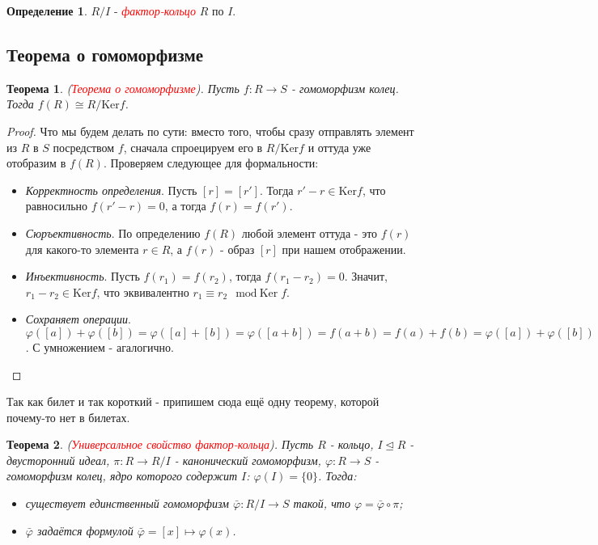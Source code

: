 \documentclass[a4paper,100pt]{article}
\theoremstyle{indented}
\newtheorem{theorem}{Теорема}
\theoremstyle{definition}
\newtheorem{defn}{Определение}
\theoremstyle{remark}
\begin{document}
\begin{defn}
    $R/I$ - \hypertarget{n24}{\textcolor{red}{\textit{фактор-кольцо}}} $R$ по $I$.
\end{defn}

\resetall

\subsection{Теорема о гомоморфизме}

\begin{theorem}
    (\hypertarget{n25}{\textcolor{red}{\textit{Теорема о гомоморфизме}}}). Пусть $f:R\rightarrow S$ - гомоморфизм колец. Тогда $f(R)\cong R/\text{Ker}f$.
\end{theorem}

\begin{proof}
    Что мы будем делать по сути: вместо того, чтобы сразу отправлять элемент из $R$ в $S$ посредством $f$, сначала спроецируем его в $R/\text{Ker} f$ и оттуда уже отобразим в $f(R)$. Проверяем следующее для формальности:\ 

    \begin{itemize}
        \item \textit{Корректность определения}. Пусть $[r]=[r']$. Тогда $r'-r\in \text{Ker} f$, что равносильно $f(r'-r)=0$, а тогда $f(r)=f(r')$.
        \item \textit{Сюръективность}. По определению $f(R)$ любой элемент оттуда - это $f(r)$ для какого-то элемента $r\in R$, а $f(r)$ - образ $[r]$ при нашем отображении.
        \item \textit{Инъективность}. Пусть $f(r_1)=f(r_2)$, тогда $f(r_1-r_2)=0$. Значит, $r_1-r_2\in \text{Ker} f$, что эквивалентно $r_1\equiv r_2 \mod \text{Ker} f$.
        \item \textit{Сохраняет операции}. $\varphi([a])+\varphi([b])=\varphi([a]+[b])=\varphi([a+b])=f(a+b)=f(a)+f(b)=\varphi([a])+\varphi([b])$. С умножением - агалогично.
    \end{itemize}
\end{proof}

Так как билет и так короткий - припишем сюда ещё одну теорему, которой почему-то нет в билетах.\\

\begin{theorem}
    (\hypertarget{n26}{\textcolor{red}{\textit{Универсальное свойство фактор-кольца}}}). Пусть $R$ - кольцо, $I\trianglelefteq R$ - двусторонний идеал, $\pi: R\rightarrow R/I$ - канонический гомоморфизм, $\varphi: R\rightarrow S$ - гомоморфизм колец, ядро которого содержит $I$: $\varphi(I)=\{0\}$. Тогда:\

    \begin{itemize}
        \item существует единственный гомоморфизм $\bar{\varphi}:R/I\rightarrow S$ такой, что $\varphi=\bar{\varphi}\circ \pi$;
        \item $\bar{\varphi}$ задаётся формулой $\bar{\varphi}=[x]\mapsto \varphi(x)$.
    \end{itemize}
\end{theorem}
\end{document}
